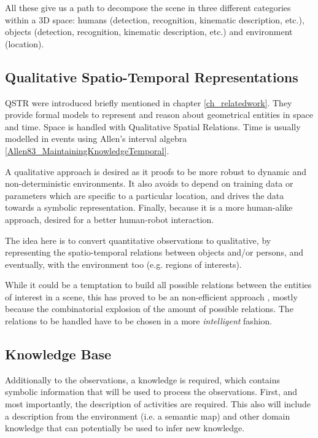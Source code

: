 All these give us a path to decompose the scene in three different categories within a 3D space: humans (detection, recognition, kinematic description, etc.), objects (detection, recognition, kinematic description, etc.) and environment (location).

\subsection{Qualitative Spatio-Temporal Representations}
QSTR were introduced briefly mentioned in chapter \ref{ch_relatedwork}.
They provide formal models to represent and reason about geometrical entities in space and time.
Space is handled with Qualitative Spatial Relations. %
Time is usually modelled in events using Allen's interval algebra \ref{Allen83_MaintainingKnowledgeTemporal}. %

A qualitative approach is desired as it proofs to be more robust to dynamic and non-deterministic environments.
It also avoids to depend on training data or parameters which are specific to a particular location, and drives the data towards a symbolic representation.
Finally, because it is a more human-alike approach, desired for a better human-robot interaction.

The idea here is to convert quantitative observations to qualitative, by representing the spatio-temporal relations between objects and/or persons, and eventually, with the environment too (e.g. regions of interests).

While it could be a temptation to build all possible relations between the entities of interest in a scene, this has proved to be an non-efficient approach \citep{Sridhar10_UnsupervisedLearning}, mostly because the combinatorial explosion of the amount  of possible relations. The relations to be handled have to be chosen in a more \textit{intelligent} fashion.


\subsection{Knowledge Base}
Additionally to the observations, a knowledge is required, which contains symbolic information that will be used to process the 
observations.
First, and most importantly, the description of activities are required.
This also will include a description from the environment (i.e. a semantic map) and other domain knowledge that can potentially be used to infer new knowledge.

